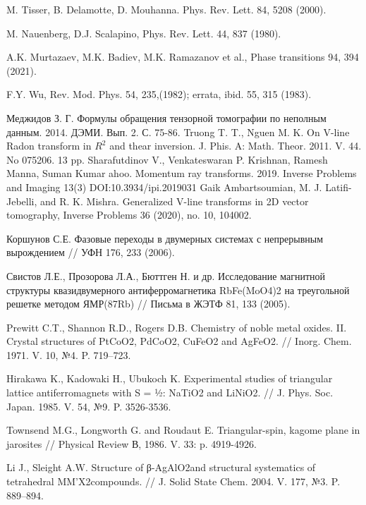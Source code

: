 \begin{thebibliography}{111}
M. Tisser, B. Delamotte, D. Mouhanna. Phys. Rev. Lett. 84, 5208 (2000).

M. Nauenberg, D.J. Scalapino, Phys. Rev. Lett. 44, 837 (1980).

A.K. Murtazaev, M.K. Badiev, M.K. Ramazanov et al., Phase transitions 94, 394 (2021).

F.Y. Wu, Rev. Mod. Phys. 54, 235,(1982); errata, ibid. 55, 315 (1983).


  Меджидов З. Г. Формулы обращения тензорной томографии по неполным данным. 2014. ДЭМИ. Вып. 2. С. 75-86.
 Truong T. T., Nguen M. K. On V-line Radon transform in $R^2$   and thear inversion. J. Phis. A: Math. Theor. 2011. V. 44. No 075206. 13 pp.
 Sharafutdinov V., Venkateswaran P. Krishnan, Ramesh Manna, Suman Kumar ahoo. Momentum ray transforms. 2019. Inverse Problems and Imaging 13(3) DOI:10.3934/ipi.2019031
 Gaik Ambartsoumian, M. J. Latifi-Jebelli, and R. K. Mishra. Generalized V-line transforms in 2D vector tomography, Inverse Problems 36 (2020), no. 10, 104002.


Коршунов С.Е. Фазовые переходы в двумерных системах с непрерывным вырождением // УФН 176, 233 (2006).

Свистов Л.Е., Прозорова Л.А., Бюттген Н. и др. Исследование магнитной структуры квазидвумерного антиферромагнетика RbFe(MoO4)2 на треугольной решетке методом ЯМР(87Rb) // Письма в ЖЭТФ 81, 133 (2005).

Prewitt C.T., Shannon R.D., Rogers D.B. Chemistry of noble metal oxides. II. Crystal structures of PtCoO2, PdCoO2, CuFeO2 and AgFeO2. // Inorg. Chem. 1971. V. 10, №4. P. 719--723.

Hirakawa K., Kadowaki H., Ubukoch K. Experimental studies of triangular lattice antiferromagnets with S = ½: NaTiO2 and LiNiO2. // J. Phys. Soc. Japan. 1985. V. 54, №9. P. 3526-3536.

Townsend M.G., Longworth G. and Roudaut E. Triangular-spin, kagome plane in jarosites // Physical Review В, 1986. V. 33: p. 4919-4926.

Li J., Sleight A.W. Structure of β-AgAlO2and structural systematics of tetrahedral MM’X2compounds. // J. Solid State Chem. 2004.  V. 177, №3. P. 889--894.


\end{thebibliography}
